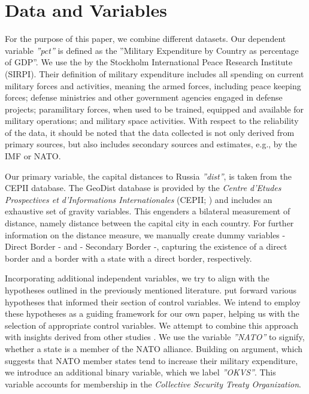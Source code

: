 \documentclass[12pt,a4paper]{article}
\begin{document}
\section{Data and Variables}
For the purpose of this paper, we combine different datasets. Our dependent variable \textit{''pct''} is defined as the ''Military Expenditure by Country as percentage of GDP''. We use the \citet{SIRPI} by the Stockholm International Peace Research Institute (SIRPI). Their definition of military expenditure includes all spending on current military forces and activities, meaning the armed forces, including peace keeping forces; defense ministries and other government agencies engaged in defense projects; paramilitary forces, when used to be trained, equipped and available for military operations; and military space activities. With respect to the reliability of the data, it should be noted that the data collected is not only derived from primary sources, but also includes secondary sources and estimates, e.g., by the IMF or NATO. 

Our primary variable, the capital distances to Russia \textit{''dist''}, is taken from the CEPII database. The GeoDist database is provided by the \textit{Centre d’Etudes Prospectives et d’Informations Internationales} (CEPII; \citealp{mayer2011}) and includes an exhaustive set of gravity variables. This engenders a bilateral measurement of distance, namely distance between the capital city in each country. For further information on the distance measure, we manually create dummy variables - Direct Border - and - Secondary Border -, capturing the existence of a direct border and a border with a state with a direct border, respectively.

Incorporating additional independent variables, we try to align with the hypotheses outlined in the previously mentioned literature. \citet{kofrovn2023} put forward various hypotheses that informed their section of control variables. We intend to employ these hypotheses as a guiding framework for our own paper, helping us with the selection of appropriate control variables. We attempt to combine this approach with insights derived from other studies \citep{nordhaus2012,lin2019}. We use the variable \textit{''NATO''} to signify, whether a state is a member of the NATO alliance. Building on \citet{kofrovn2023} argument, which suggests that NATO member states tend to increase their military expenditure, we introduce an additional binary variable, which we label \textit{''OKVS''}. This variable accounts for membership in the \textit{Collective Security Treaty Organization}. 
\end{document}
